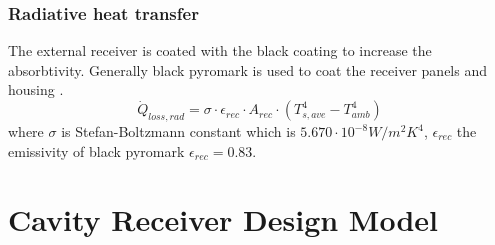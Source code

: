 \subsubsection{Radiative heat transfer}
The external receiver is coated with the black coating to increase the absorbtivity. Generally black pyromark is used to coat the receiver panels and housing \cite{Zavoico.2001}.
\begin{equation}
\dot Q_{loss,rad}=\sigma \cdot \epsilon_{rec}\cdot A_{rec}\cdot (T_{s,ave}^4-T_{amb}^4)
\end{equation}
where  $\sigma$ is Stefan-Boltzmann constant which is $ 5.670 \cdot 10^{-8} W / m^2 K^4$,  $\epsilon_{rec}$ the emissivity of black pyromark \cite{Zavoico.2001} $\epsilon_{rec} = 0.83$.
\section{Cavity Receiver Design Model}
